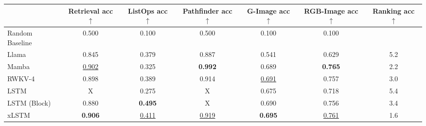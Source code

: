 \begin{tabular}{lcccccc}
    \toprule
    & \thead{Retrieval \\ acc $\uparrow$} & \thead{ListOps \\ acc $\uparrow$} & \thead{Pathfinder \\ acc $\uparrow$} & \thead{G-Image \\ acc $\uparrow$} & \thead{RGB-Image \\ acc $\uparrow$} & \thead{Ranking \\ acc $\uparrow$} \\ \midrule
Random Baseline & 0.500 & 0.100 & 0.500 & 0.100 & 0.100 &  \\ \midrule
Llama & 0.845 & 0.379 & 0.887 & 0.541 & 0.629 & 5.2\\ %
Mamba & \underline{0.902} & 0.325 & \textbf{0.992} & 0.689 & \textbf{0.765} & 2.2 \\ %
RWKV-4 & 0.898 & 0.389 & 0.914 & \underline{0.691} & 0.757 & 3.0\\ 
LSTM & X & 0.275 & X & 0.675 & 0.718 & 5.4 \\ 
LSTM (Block) & 0.880 & \textbf{0.495} & X & 0.690 & 0.756 & 3.4 \\ \midrule
xLSTM & \textbf{0.906} & \underline{0.411} & \underline{0.919} & \textbf{0.695} & \underline{0.761} & 1.6 \\ 
\bottomrule
    \end{tabular}
    